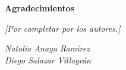 \newpage
\thispagestyle{empty}
\vspace*{2cm}
\begin{center}
  {\large\bfseries Agradecimientos}
\end{center}
\vspace{1cm}

\noindent\textit{[Por completar por los autores.]}

\vspace{2cm}
\begin{flushright}
  \textit{Natalia Anaya Ram\'irez}\\[0.5cm]
  \textit{Diego Salazar Villagr\'an}
\end{flushright}


\renewcommand{\cftfigpresnum}{Figura~}
\renewcommand{\cftfigaftersnum}{.}
\setlength{\cftfignumwidth}{5.5em}
\setlength{\cftfigindent}{0pt}
\newpage
\renewcommand{\cfttabpresnum}{Tabla~}
\renewcommand{\cfttabaftersnum}{.}
\setlength{\cfttabnumwidth}{9.5em}
\setlength{\cfttabindent}{0pt}
\newpage
\tableofcontents

\newpage
\listoffigures

\newpage
\listoftables
\newpage

